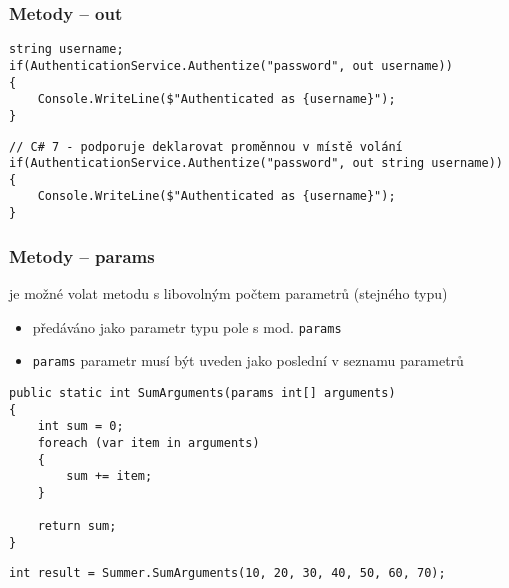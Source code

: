 \begin{frame}[fragile]
\frametitle{Metody -- out}
\vfill
\begin{yesblock}
\begin{lstlisting}[basicstyle=\small]
string username;
if(AuthenticationService.Authentize("password", out username))
{
    Console.WriteLine($"Authenticated as {username}");
}
\end{lstlisting}
\end{yesblock}
\vfill
\begin{yesblock}
\begin{lstlisting}[basicstyle=\small]
// C# 7 - podporuje deklarovat proměnnou v místě volání
if(AuthenticationService.Authentize("password", out string username))
{
    Console.WriteLine($"Authenticated as {username}");
}
\end{lstlisting}
\end{yesblock}
\vfill
\end{frame}




\nezkouskove

\begin{frame}[fragile]
\frametitle{Metody -- params}
\begin{bitemize}{}
\item je možné volat metodu s libovolným počtem parametrů (stejného typu)
\begin{itemize}
\item předáváno jako parametr typu pole s mod. \lstinline|params|
\item \lstinline|params| parametr musí být uveden jako poslední v seznamu parametrů
\end{itemize}

\end{bitemize}
\vfill
\begin{yesblock}
\begin{lstlisting}[basicstyle=\small]
public static int SumArguments(params int[] arguments)
{
    int sum = 0;
    foreach (var item in arguments)
    {
        sum += item;
    }

    return sum;
}
\end{lstlisting}
\end{yesblock}
\vfill
\begin{yesblock}
\begin{lstlisting}[basicstyle=\small]
int result = Summer.SumArguments(10, 20, 30, 40, 50, 60, 70);
\end{lstlisting}
\end{yesblock}
\end{frame}





